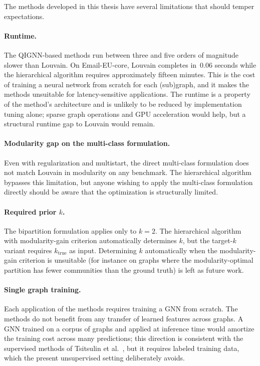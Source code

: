 The methods developed in this thesis have several limitations
that should temper expectations.

\paragraph{Runtime.} The QIGNN-based methods run between three
and five orders of magnitude slower than Louvain. On
Email-EU-core, Louvain completes in~$0.06$ seconds while the
hierarchical algorithm requires approximately fifteen minutes.
This is the cost of training a neural network from scratch for
each (sub)graph, and it makes the methods unsuitable for
latency-sensitive applications. The runtime is a property of the
method's architecture and is unlikely to be reduced by
implementation tuning alone; sparse graph operations and
GPU acceleration would help, but a structural runtime gap to
Louvain would remain.

\paragraph{Modularity gap on the multi-class formulation.} Even
with regularization and multistart, the direct multi-class
formulation does not match Louvain in modularity on any
benchmark. The hierarchical algorithm bypasses this limitation,
but anyone wishing to apply the multi-class formulation directly
should be aware that the optimization is structurally limited.

\paragraph{Required prior $k$.} The bipartition formulation
applies only to $k=2$. The hierarchical algorithm with
modularity-gain criterion automatically determines $k$, but the
target-$k$ variant requires $k_{\mathrm{true}}$ as input.
Determining $k$ automatically when the modularity-gain criterion
is unsuitable (for instance on graphs where the modularity-optimal
partition has fewer communities than the ground truth) is left
as future work.

\paragraph{Single graph training.} Each application of the
methods requires training a GNN from scratch. The methods do not
benefit from any transfer of learned features across graphs. A
GNN trained on a corpus of graphs and applied at inference time
would amortize the training cost across many predictions; this
direction is consistent with the supervised methods of
Tsitsulin et al.~\cite{tsitsulin2020graph}, but it requires
labeled training data, which the present unsupervised setting
deliberately avoids.

